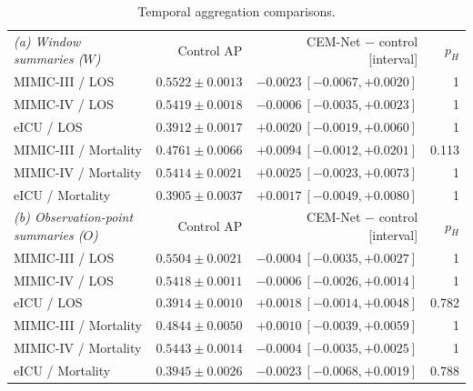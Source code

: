 \begin{table}[!t]
\centering\small
\setlength{\tabcolsep}{4pt}
\caption{Temporal aggregation comparisons.}
\label{tab:targeted-aggregation}
\begin{tabular}{@{}lrrr@{}}
\toprule
\textit{(a) Window summaries ($W$)} & Control AP & CEM-Net $-$ control [interval] & $p_H$ \\
MIMIC-III / LOS & $0.5522\pm0.0013$ & $-0.0023\ [-0.0067,+0.0020]$ & 1 \\
MIMIC-IV / LOS & $0.5419\pm0.0018$ & $-0.0006\ [-0.0035,+0.0023]$ & 1 \\
eICU / LOS & $0.3912\pm0.0017$ & $+0.0020\ [-0.0019,+0.0060]$ & 1 \\
MIMIC-III / Mortality & $0.4761\pm0.0066$ & $+0.0094\ [-0.0012,+0.0201]$ & 0.113 \\
MIMIC-IV / Mortality & $0.5414\pm0.0021$ & $+0.0025\ [-0.0023,+0.0073]$ & 1 \\
eICU / Mortality & $0.3905\pm0.0037$ & $+0.0017\ [-0.0049,+0.0080]$ & 1 \\
\midrule
\textit{(b) Observation-point summaries ($O$)} & Control AP & CEM-Net $-$ control [interval] & $p_H$ \\
MIMIC-III / LOS & $0.5504\pm0.0021$ & $-0.0004\ [-0.0035,+0.0027]$ & 1 \\
MIMIC-IV / LOS & $0.5418\pm0.0011$ & $-0.0006\ [-0.0026,+0.0014]$ & 1 \\
eICU / LOS & $0.3914\pm0.0010$ & $+0.0018\ [-0.0014,+0.0048]$ & 0.782 \\
MIMIC-III / Mortality & $0.4844\pm0.0050$ & $+0.0010\ [-0.0039,+0.0059]$ & 1 \\
MIMIC-IV / Mortality & $0.5443\pm0.0014$ & $-0.0004\ [-0.0035,+0.0025]$ & 1 \\
eICU / Mortality & $0.3945\pm0.0026$ & $-0.0023\ [-0.0068,+0.0019]$ & 0.788 \\
\bottomrule
\end{tabular}
\par{}
\end{table}
